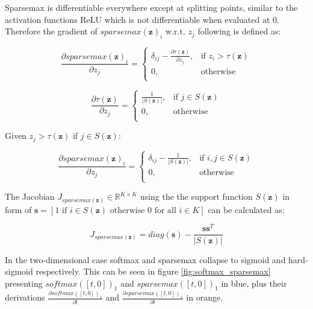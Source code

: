 \documentclass[../main.tex]{subfiles}
\begin{document}
Sparsemax is differentiable everywhere except at splitting points, similar to the activation functions ReLU which is not differentiable when evaluated at 0. Therefore the gradient of $sparsemax(\mathbf{z})_i$ w.r.t. $z_j$ following \cite{martins_softmax_2016} is defined as:

\begin{equation}
    \frac{\partial sparsemax(\mathbf{z})_i}{\partial z_j} = 
    \begin{cases}
        \delta_{ij} - \frac{\partial \tau(\mathbf{z})}{\partial z_j},& \text{if } z_i > \tau(\mathbf{z}) \\
        0,& \text{otherwise } \\
    \end{cases}
\end{equation}

\begin{equation}
    \frac{\partial \tau(\mathbf{z})}{\partial z_j} = 
    \begin{cases}
        \frac{1}{|S(\mathbf{z})|},& \text{if } j \in S(\mathbf{z}) \\
        0,& \text{otherwise } \\
    \end{cases}
\end{equation}

Given $z_j > \tau(\mathbf{z})$ if $j \in S(\mathbf{z})$:

\begin{equation}
    \frac{\partial sparsemax(\mathbf{z})_i}{\partial z_j} = 
    \begin{cases}
        \delta_{ij} - \frac{1}{|S(\mathbf{z})|},& \text{if } i,j \in S(\mathbf{z}) \\
        0,& \text{otherwise } \\
    \end{cases}
\end{equation}

The Jacobian $J_{sparsemax(\mathbf{z})} \in \mathbb{R}^{K \times K}$ using the the support function $S(\mathbf{z})$ in form of $\mathbf{s}=[1 \text{ if } i \in S(\mathbf{z}) \text{ otherwise } 0 \text{ for all } i \in K]$ can be calculated as:

\begin{equation}
    J_{sparsemax(\mathbf{z})}=diag(\mathbf{s})-\frac{\mathbf{s}\mathbf{s}^T}{|S(\mathbf{z})|}
\end{equation}

In the two-dimensional case softmax and sparsemax collapse to sigmoid and hard-sigmoid respectively. This can be seen in figure \ref{fig:softmax_sparsemax} presenting $softmax([t,0])_1$ and $sparsemax([t,0])_1$ in blue, plus their derivations $\frac{\partial softmax([t,0])_1}{\partial t}$ and $\frac{\partial sparsemax([t,0])_1}{\partial t}$ in orange.
\end{document}
